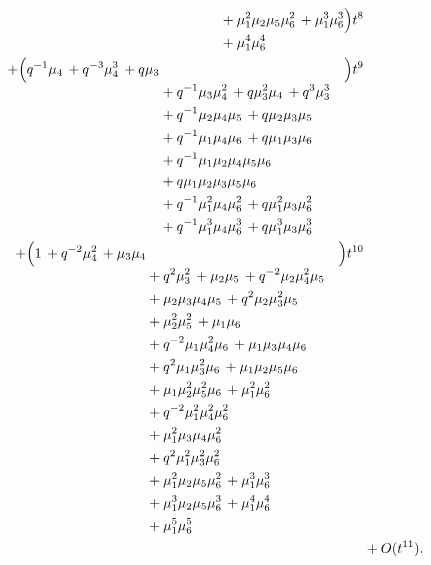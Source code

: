 \documentclass[10pt]{article}
\begin{document}
\[\begin{aligned}
\begin{aligned}[t]
  &{}+\mu_{1}^{2}\mu_{2}\mu_{5}\mu_{6}^{2}\,+\mu_{1}^{3}\mu_{6}^{3} \\
  &{}+\mu_{1}^{4}\mu_{6}^{4}\end{aligned}\Bigr)t^{8} \\
  + \Bigl(\begin{aligned}[t]q^{-1}\mu_{4}\,+q^{-3}\mu_{4}^{3}\,+q\mu_{3} \\
  &{}+q^{-1}\mu_{3}\mu_{4}^{2}\,+q\mu_{3}^{2}\mu_{4}\,+q^{3}\mu_{3}^{3} \\
  &{}+q^{-1}\mu_{2}\mu_{4}\mu_{5}\,+q\mu_{2}\mu_{3}\mu_{5} \\
  &{}+q^{-1}\mu_{1}\mu_{4}\mu_{6}\,+q\mu_{1}\mu_{3}\mu_{6} \\
  &{}+q^{-1}\mu_{1}\mu_{2}\mu_{4}\mu_{5}\mu_{6} \\
  &{}+q\mu_{1}\mu_{2}\mu_{3}\mu_{5}\mu_{6} \\
  &{}+q^{-1}\mu_{1}^{2}\mu_{4}\mu_{6}^{2}\,+q\mu_{1}^{2}\mu_{3}\mu_{6}^{2} \\
  &{}+q^{-1}\mu_{1}^{3}\mu_{4}\mu_{6}^{3}\,+q\mu_{1}^{3}\mu_{3}\mu_{6}^{3}\end{aligned}\Bigr)t^{9} \\
  + \Bigl(\begin{aligned}[t]1\,+q^{-2}\mu_{4}^{2}\,+\mu_{3}\mu_{4} \\
  &{}+q^{2}\mu_{3}^{2}\,+\mu_{2}\mu_{5}\,+q^{-2}\mu_{2}\mu_{4}^{2}\mu_{5} \\
  &{}+\mu_{2}\mu_{3}\mu_{4}\mu_{5}\,+q^{2}\mu_{2}\mu_{3}^{2}\mu_{5} \\
  &{}+\mu_{2}^{2}\mu_{5}^{2}\,+\mu_{1}\mu_{6} \\
  &{}+q^{-2}\mu_{1}\mu_{4}^{2}\mu_{6}\,+\mu_{1}\mu_{3}\mu_{4}\mu_{6} \\
  &{}+q^{2}\mu_{1}\mu_{3}^{2}\mu_{6}\,+\mu_{1}\mu_{2}\mu_{5}\mu_{6} \\
  &{}+\mu_{1}\mu_{2}^{2}\mu_{5}^{2}\mu_{6}\,+\mu_{1}^{2}\mu_{6}^{2} \\
  &{}+q^{-2}\mu_{1}^{2}\mu_{4}^{2}\mu_{6}^{2} \\
  &{}+\mu_{1}^{2}\mu_{3}\mu_{4}\mu_{6}^{2} \\
  &{}+q^{2}\mu_{1}^{2}\mu_{3}^{2}\mu_{6}^{2} \\
  &{}+\mu_{1}^{2}\mu_{2}\mu_{5}\mu_{6}^{2}\,+\mu_{1}^{3}\mu_{6}^{3} \\
  &{}+\mu_{1}^{3}\mu_{2}\mu_{5}\mu_{6}^{3}\,+\mu_{1}^{4}\mu_{6}^{4} \\
  &{}+\mu_{1}^{5}\mu_{6}^{5}\end{aligned}\Bigr)t^{10} \\
  &+ O(t^{11}).
\end{aligned}
\]
\end{document}
